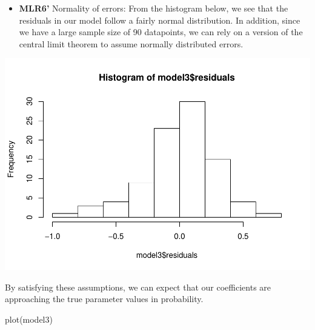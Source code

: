 \documentclass[]{article}
\newenvironment{Shaded}{}{}
\newcommand{\KeywordTok}[1]{\textcolor[rgb]{0.00,0.00,1.00}{#1}}
\newcommand{\NormalTok}[1]{#1}
\newcommand{\OperatorTok}[1]{#1}
\providecommand{\tightlist}{%
  \setlength{\itemsep}{0pt}\setlength{\parskip}{0pt}}
\begin{document}
\begin{itemize}
\tightlist
\item
  \textbf{MLR6'} Normality of errors: From the histogram below, we see
  that the residuals in our model follow a fairly normal distribution.
  In addition, since we have a large sample size of 90 datapoints, we
  can rely on a version of the central limit theorem to assume normally
  distributed errors.
\end{itemize}

\begin{Shaded}
\end{Shaded}

\includegraphics{Bagnard_Gaustad_Hartman_Leung_Lab_3_files/figure-latex/unnamed-chunk-104-1.pdf}

By satisfying these assumptions, we can expect that our coefficients are
approaching the true parameter values in probability.

\begin{Shaded}
\begin{Highlighting}[]
\KeywordTok{plot}\NormalTok{(model3)}
\end{Highlighting}
\end{Shaded}
\end{document}
